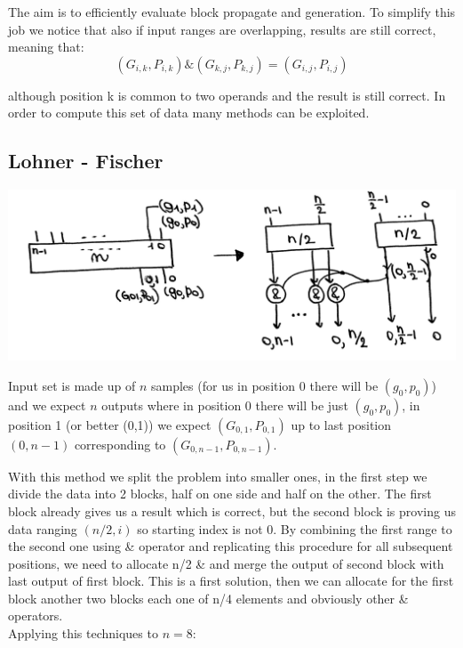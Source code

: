 The aim is to efficiently evaluate block propagate and generation. To simplify this job we notice that also if input ranges are overlapping, results are still correct, meaning that:
$$(G_{i,k}, P_{i, k}) \& (G_{k, j}, P_{k, j}) = (G_{i,j}, P_{i, j})$$

although position k is common to two operands and the result is still correct. In order to compute this set of data many methods can be exploited.


\subsection{Lohner - Fischer}
\begin{center}
  \includegraphics[width=0.7\linewidth]{img/img2/20}
\end{center}
Input set is made up of $n$ samples (for us in position 0 there will be $(g_0, p_0)$) and we expect $n$ outputs where in position 0 there will be just $(g_0, p_0)$, in position 1 (or better (0,1)) we expect $(G_{0,1}, P_{0,1})$ up to last position $(0, n-1)$ corresponding to $(G_{0,n-1}, P_{0,n-1})$.

With this method we split the problem into smaller ones, in the first step we divide the data into 2 blocks, half on one side and half on the other. The first block already gives us a result which is correct, but the second block is proving us data ranging $(n/2, i)$ so starting index is not 0. By combining the first range to the second one using \& operator and replicating this procedure for all subsequent positions, we need to allocate n/2 \& and merge the output of second block with last output of first block.
This is a first solution, then we can allocate for the first block another two blocks each one of n/4 elements and obviously other \& operators.\\

Applying this techniques to $n=8$:

